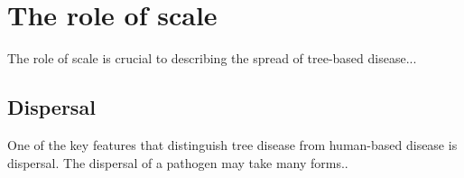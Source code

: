 \section{The role of scale}
The role of scale is crucial to describing the spread of tree-based disease...
\blindtext

\subsection{Dispersal}
One of the key features that distinguish tree disease from human-based disease is dispersal. The dispersal of a pathogen may take many forms..
\blindtext

